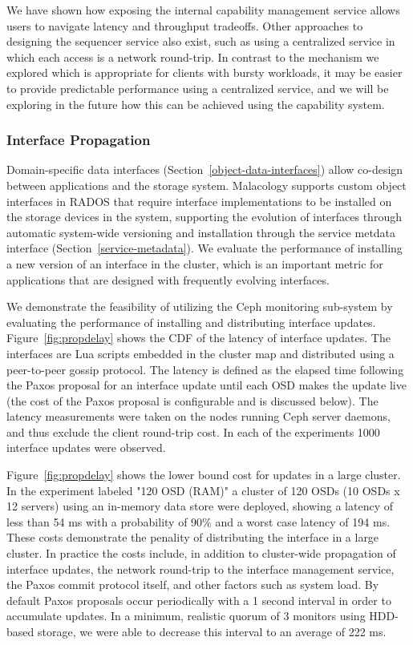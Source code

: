 \documentclass[preprint]{sigplanconf-eurosys}
\begin{document}
We have shown how exposing the internal capability management service allows
users to navigate latency and throughput tradeoffs.  Other approaches to
designing the sequencer service also exist, such as using a centralized
service in which each access is a network round-trip. In contrast to the
mechanism we explored which is appropriate for clients with bursty workloads,
it may be easier to provide predictable performance using a centralized
service, and we will be exploring in the future how this can be achieved using
the capability system.

\subsubsection{Interface Propagation}

Domain-specific data interfaces (Section~\ref{object-data-interfaces}) allow
co-design between applications and the storage system. Malacology supports
custom object interfaces in RADOS that require interface implementations to
be installed on the storage devices in the system, supporting the evolution of
interfaces through automatic system-wide versioning and installation through
the service metdata interface (Section~\ref{service-metadata}). We evaluate
the performance of installing a new version of an interface in the cluster,
which is an important metric for applications that are designed with
frequently evolving interfaces.

We demonstrate the feasibility of utilizing the Ceph monitoring sub-system by
evaluating the performance of installing and distributing interface updates.
Figure~\ref{fig:propdelay} shows the CDF of the latency of interface updates.
The interfaces are Lua scripts embedded in the cluster map and distributed
using a peer-to-peer gossip protocol.  The latency is defined as the elapsed
time following the Paxos proposal for an interface update until each OSD makes
the update live (the cost of the Paxos proposal is configurable and is
discussed below). The latency measurements were taken on the nodes running
Ceph server daemons, and thus exclude the client round-trip cost. In each of
the experiments 1000 interface updates were observed.

Figure~\ref{fig:propdelay} shows the lower bound cost for updates in a large
cluster. In the experiment labeled "120 OSD (RAM)" a cluster of 120 OSDs (10
OSDs x 12 servers) using an in-memory data store were deployed, showing a
latency of less than 54 ms with a probability of 90\% and a worst case latency
of 194 ms. These costs demonstrate the penality of distributing the interface
in a large cluster. In practice the costs include, in addition to cluster-wide
propagation of interface updates, the network round-trip to the
interface management service, the Paxos commit protocol itself, and other factors
such as system load. By default Paxos proposals occur periodically with a 1
second interval in order to accumulate updates. In a minimum, realistic quorum
of 3 monitors using HDD-based storage, we were able to decrease this interval
to an average of 222 ms.
\end{document}
